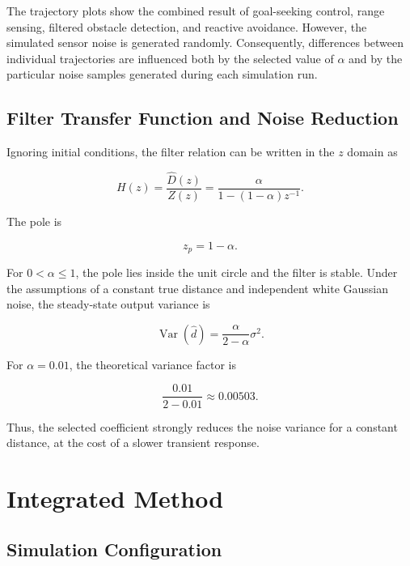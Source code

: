 \documentclass[10pt,twocolumn,a4paper]{article}
\begin{document}
The trajectory plots show the combined result of goal-seeking control,
range sensing, filtered obstacle detection, and reactive avoidance.
However, the simulated sensor noise is generated randomly. Consequently,
differences between individual trajectories are influenced both by the
selected value of $\alpha$ and by the particular noise samples generated
during each simulation run.

\subsection{Filter Transfer Function and Noise Reduction}

Ignoring initial conditions, the filter relation can be written in the
$z$ domain as

\begin{equation}
    H(z)
    =
    \frac{\hat{D}(z)}{Z(z)}
    =
    \frac{\alpha}
    {1-(1-\alpha)z^{-1}}.
    \label{eq:filter_transfer_function}
\end{equation}

The pole is

\begin{equation}
    z_p=1-\alpha.
    \label{eq:filter_pole}
\end{equation}

For $0<\alpha\leq 1$, the pole lies inside the unit circle and the filter
is stable. Under the assumptions of a constant true distance and
independent white Gaussian noise, the steady-state output variance is

\begin{equation}
    \operatorname{Var}(\hat{d})
    =
    \frac{\alpha}{2-\alpha}\sigma^2.
    \label{eq:filtered_variance}
\end{equation}

For $\alpha=0.01$, the theoretical variance factor is

\[
    \frac{0.01}{2-0.01}\approx 0.00503.
\]

Thus, the selected coefficient strongly reduces the noise variance for
a constant distance, at the cost of a slower transient response.

\section{Integrated Method}

\subsection{Simulation Configuration}
\end{document}
